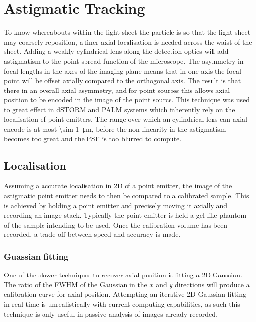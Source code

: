 \section{Astigmatic Tracking}

To know whereabouts within the light-sheet the particle is so that the light-sheet may coarsely reposition, a finer axial localisation is needed across the waist of the sheet.
Adding a weakly cylindrical lens along the detection optics will add astigmatism to the point spread function of the microscope.
The asymmetry in focal lengths in the axes of the imaging plane means that in one axis the focal point will be offset axially compared to the orthogonal axis.
The result is that there in an overall axial asymmetry, and for point sources this allows axial position to be encoded in the image of the point source.
This technique was used to great effect in dSTORM and PALM systems which inherently rely on the localisation of point emitters.
The range over which an cylindrical lens can axial encode is at most \SI{\sim 1}{\micro\metre}, before the non-linearity in the astigmatism becomes too great and the PSF is too blurred to compute.

\subsection{Localisation}

Assuming a accurate localisation in 2D of a point emitter, the image of the astigmatic point emitter needs to then be compared to a calibrated sample.
This is achieved by holding a point emitter and precisely moving it axially and recording an image stack.
Typically the point emitter is held a gel-like phantom of the sample intending to be used.
Once the calibration volume has been recorded, a trade-off between speed and accuracy is made.

\subsubsection{Guassian fitting}
One of the slower techniques to recover axial position is fitting a 2D Gaussian.
The ratio of the FWHM of the Gaussian in the $x$ and $y$ directions will produce a calibration curve for axial position.
Attempting an iterative 2D Gaussian fitting in real-time is unrealistically with current computing capabilities, as such this technique is only useful in passive analysis of images already recorded.

